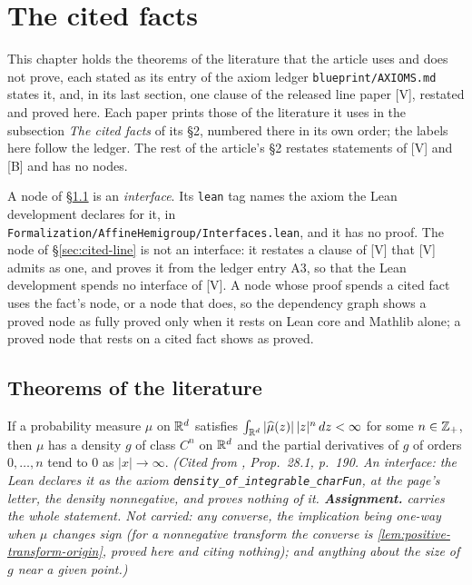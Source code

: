 \chapter{The cited facts}
\label{ch:cited-facts}

This chapter holds the theorems of the literature that the article uses and does not prove, each
stated as its entry of the axiom ledger \texttt{blueprint/AXIOMS.md} states it, and, in its last
section, one clause of the released line paper [V], restated and proved here. Each paper prints those of
the literature it uses in the subsection \emph{The cited facts} of its \S 2, numbered there in its own order; the labels here
follow the ledger. The rest of the article's \S 2 restates statements of [V] and [B] and has no
nodes.

A node of \S\ref{sec:cited-literature} is an \emph{interface}. Its \texttt{lean} tag names the axiom
the Lean development declares for it, in \texttt{Formalization/AffineHemigroup/Interfaces.lean}, and
it has no proof. The node of \S\ref{sec:cited-line} is not an interface: it restates a clause of [V]
that [V] admits as one, and proves it from the ledger entry A3, so that the Lean development spends
no interface of [V]. A node whose proof spends a cited fact uses the fact's node, or a node that
does, so the dependency graph shows a proved node as fully proved only when it rests on Lean core
and Mathlib alone; a proved node that rests on a cited fact shows as proved.

\section{Theorems of the literature}
\label{sec:cited-literature}

\begin{theorem}
\label{thm:cited-A1}
\leanok
If a probability measure $\mu$ on $\mathbb{R}^d$ satisfies
$\int_{\mathbb{R}^d}|\widehat\mu(z)|\,|z|^n\,dz<\infty$ for some $n\in\mathbb{Z}_+$, then $\mu$ has a
density $g$ of class $C^n$ on $\mathbb{R}^d$ and the partial derivatives of $g$ of orders
$0,\dots,n$ tend to $0$ as $|x|\to\infty$.
\statusA\quad{}\quad\emph{(Cited from , Prop.~28.1, p.~190. An
interface: the Lean declares it as the axiom \texttt{density\_of\_integrable\_charFun}, at the
page's letter, the density nonnegative, and proves nothing of it. \textbf{Assignment.}
 carries the whole statement. Not carried: any converse, the implication being one-way
when $\widehat\mu$ changes sign (for a nonnegative transform the converse is
\ref{lem:positive-transform-origin}, proved here and citing nothing); and anything about the size of
$g$ near a given point.)}
\end{theorem}


